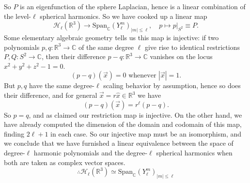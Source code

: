 \documentclass[11pt,letterpaper]{article}
\newcommand{\LP}{\left(}
\newcommand{\RP}{\right)}
\newcommand{\mc}[1]{\mathcal{#1}}
\newcommand{\R}{\mathbb{R}}
\newcommand{\C}{\mathbb{C}}
\begin{document}
So $P$ is an eigenfunction of the sphere Laplacian, hence is a linear combination of the level-$\ell$ spherical harmonics. So we have cooked up a linear map \begin{equation}
\mc{H}_\ell(\R^3) \to \mbox{Span}_\C \LP Y_\ell^m \RP_{|m| \leq \ell}, \quad p \mapsto p|_{S^2} \equiv P.
\end{equation}
Some elementary algebraic geometry tells us this map is injective: if two polynomials $p,q: \R^3 \to \C$ of the same degree $\ell$ give rise to identical restrictions $P, Q: S^2 \to \C$, then their difference $p - q: \R^3 \to \C$ vanishes on the locus $x^2 + y^2 + z^2 - 1 = 0$. \begin{equation}
(p - q)(\vec{x}) = 0 \mbox{ whenever } |\vec{x}| = 1.
\end{equation}
But $p,q$ have the same degree-$\ell$ scaling behavior by assumption, hence so does their difference, and for general $\vec{x} = r \hat{x} \in \R^3$ we have \begin{equation}
(p - q)(\vec{x}) = r^\ell (p - q).
\end{equation}
So $p = q$, and as claimed our restriction map is injective. On the other hand, we have already computed the dimension of the domain and codomain of this map, finding $2 \ell + 1$ in each case. So our injective map must be an isomorphism, and we conclude that we have furnished a linear equivalence between the space of degree-$\ell$ harmonic polynomials and the degree-$\ell$ spherical harmonics when both are taken as complex vector spaces. \begin{equation}
\therefore \mc{H}_\ell(\R^3) \simeq \mbox{Span}_\C \LP Y_\ell^m \RP_{|m| \leq \ell}
\end{equation}
\end{document}

